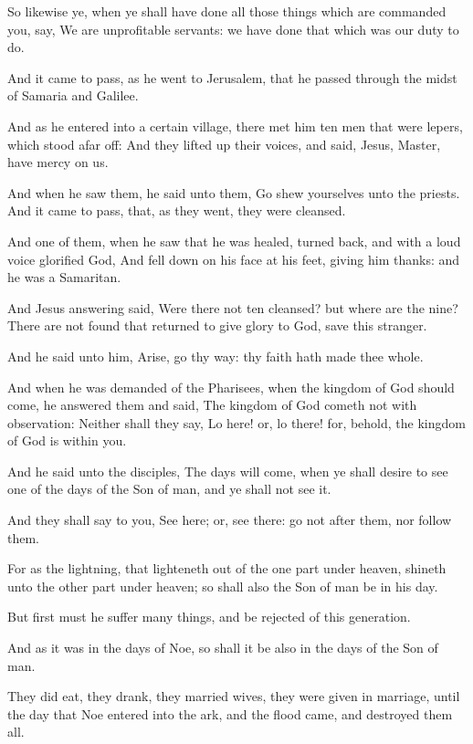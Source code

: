 \Verse So likewise ye, when ye shall have done all those things which are commanded you, say, We are unprofitable servants: we have done that which was our duty to do.

\Verse And it came to pass, as he went to Jerusalem, that he passed through the midst of Samaria and Galilee.

\Verse And as he entered into a certain village, there met him ten men that were lepers, which stood afar off: \Verse And they lifted up their voices, and said, Jesus, Master, have mercy on us.

\Verse And when he saw them, he said unto them, Go shew yourselves unto the priests. And it came to pass, that, as they went, they were cleansed.

\Verse And one of them, when he saw that he was healed, turned back, and with a loud voice glorified God, \Verse And fell down on his face at his feet, giving him thanks: and he was a Samaritan.

\Verse And Jesus answering said, Were there not ten cleansed? but where are the nine?  \Verse There are not found that returned to give glory to God, save this stranger.

\Verse And he said unto him, Arise, go thy way: thy faith hath made thee whole.

\Verse And when he was demanded of the Pharisees, when the kingdom of God should come, he answered them and said, The kingdom of God cometh not with observation: \Verse Neither shall they say, Lo here! or, lo there! for, behold, the kingdom of God is within you.

\Verse And he said unto the disciples, The days will come, when ye shall desire to see one of the days of the Son of man, and ye shall not see it.

\Verse And they shall say to you, See here; or, see there: go not after them, nor follow them.

\Verse For as the lightning, that lighteneth out of the one part under heaven, shineth unto the other part under heaven; so shall also the Son of man be in his day.

\Verse But first must he suffer many things, and be rejected of this generation.

\Verse And as it was in the days of Noe, so shall it be also in the days of the Son of man.

\Verse They did eat, they drank, they married wives, they were given in marriage, until the day that Noe entered into the ark, and the flood came, and destroyed them all.

